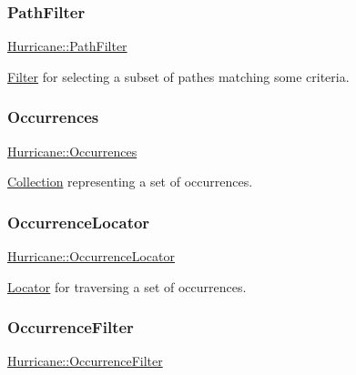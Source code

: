 \subsubsection{\texorpdfstring{Path\+Filter}{PathFilter}}
{\footnotesize\ttfamily \mbox{\hyperlink{namespaceHurricane_af42ed7a6acaba43b9d5f30b789105bc1}{Hurricane\+::\+Path\+Filter}}}

\mbox{\hyperlink{classHurricane_1_1Filter}{Filter}} for selecting a subset of pathes matching some criteria. \mbox{\label{namespaceHurricane_a1912927c128eee859af62dbe4cbe0a6b}} 
\subsubsection{\texorpdfstring{Occurrences}{Occurrences}}
{\footnotesize\ttfamily \mbox{\hyperlink{namespaceHurricane_a1912927c128eee859af62dbe4cbe0a6b}{Hurricane\+::\+Occurrences}}}

\mbox{\hyperlink{classHurricane_1_1Collection}{Collection}} representing a set of occurrences. \mbox{\label{namespaceHurricane_aa3f9cf43b9c8f3050da0a2549bb3d64d}} 
\subsubsection{\texorpdfstring{Occurrence\+Locator}{OccurrenceLocator}}
{\footnotesize\ttfamily \mbox{\hyperlink{namespaceHurricane_aa3f9cf43b9c8f3050da0a2549bb3d64d}{Hurricane\+::\+Occurrence\+Locator}}}

\mbox{\hyperlink{classHurricane_1_1Locator}{Locator}} for traversing a set of occurrences. \mbox{\label{namespaceHurricane_a4d74662402bde091565f52b77e261560}} 
\subsubsection{\texorpdfstring{Occurrence\+Filter}{OccurrenceFilter}}
{\footnotesize\ttfamily \mbox{\hyperlink{namespaceHurricane_a4d74662402bde091565f52b77e261560}{Hurricane\+::\+Occurrence\+Filter}}}

